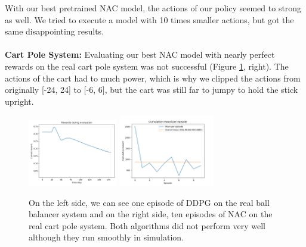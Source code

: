 With our best pretrained NAC model, the actions of our policy seemed to strong as well. We tried to execute a model with 10 times smaller actions, but got the same disappointing results.
\\\\
\textbf{Cart Pole System:} Evaluating our best NAC model with nearly perfect rewards on the real cart pole system was not successful (Figure \ref{fig:rr}, right). The actions of the cart had to much power, which is why we clipped the actions from originally [-24, 24] to [-6, 6], but the cart was still far to jumpy to hold the stick upright.

\begin{figure}
	\centering
	
	\includegraphics[width=0.35\textwidth]{plots/RR_DDPG_BB_single.png}
	\includegraphics[width=0.37\textwidth]{plots/RR_NAC_CP_10episodes.png}
	
	\caption{On the left side, we can see one episode of DDPG on the real ball balancer system and on the right side, ten episodes of NAC on the real cart pole system. Both algorithms did not perform very well although they run smoothly in simulation.}
	\label{fig:rr}
	
\end{figure}




